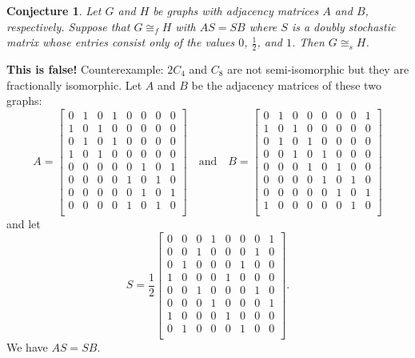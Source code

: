 \documentclass[12pt]{article}
\newcommand{\iso}{\cong}
\newcommand{\siso}{\ensuremath{\iso_s}}
\newcommand{\fiso}{\iso_f}
\newtheorem{conj}[prop]{Conjecture}
\begin{document}
\begin{conj}
  Let $G$ and $H$ be graphs with adjacency matrices $A$ and $B$,
  respectively. Suppose that $G \fiso H$ with $AS=SB$ where $S$ is a
  doubly stochastic matrix whose entries consist only of the values
  $0$, $\frac12$, and $1$. Then $G\siso H$. 
\end{conj}

\noindent\textbf{This is false!} Counterexample: $2C_4$ and $C_8$ are not
semi-isomorphic but they are fractionally isomorphic. Let $A$ and $B$
be the adjacency matrices of these two graphs:
\[
A = 
\left[
\begin{array}{cccccccc}
0 & 1 & 0 & 1 & 0 & 0 & 0 & 0 \\
1 & 0 & 1 & 0 & 0 & 0 & 0 & 0 \\
0 & 1 & 0 & 1 & 0 & 0 & 0 & 0 \\
1 & 0 & 1 & 0 & 0 & 0 & 0 & 0 \\
0 & 0 & 0 & 0 & 0 & 1 & 0 & 1 \\
0 & 0 & 0 & 0 & 1 & 0 & 1 & 0 \\
0 & 0 & 0 & 0 & 0 & 1 & 0 & 1 \\
0 & 0 & 0 & 0 & 1 & 0 & 1 & 0 \\
\end{array}
\right]
\quad\text{and}\quad
B = 
\left[
\begin{array}{cccccccc}
0 & 1 & 0 & 0 & 0 & 0 & 0 & 1 \\
1 & 0 & 1 & 0 & 0 & 0 & 0 & 0 \\
0 & 1 & 0 & 1 & 0 & 0 & 0 & 0 \\
0 & 0 & 1 & 0 & 1 & 0 & 0 & 0 \\
0 & 0 & 0 & 1 & 0 & 1 & 0 & 0 \\
0 & 0 & 0 & 0 & 1 & 0 & 1 & 0 \\
0 & 0 & 0 & 0 & 0 & 1 & 0 & 1 \\
1 & 0 & 0 & 0 & 0 & 0 & 1 & 0 \\
\end{array}
\right]
\]
and let
\[
S = \frac12\left[
\begin{array}{cccccccc}
0 & 0 & 0 & 1 & 0 & 0 & 0 & 1 \\
0 & 0 & 1 & 0 & 0 & 0 & 1 & 0 \\
0 & 1 & 0 & 0 & 0 & 1 & 0 & 0 \\
1 & 0 & 0 & 0 & 1 & 0 & 0 & 0 \\
0 & 0 & 1 & 0 & 0 & 0 & 1 & 0 \\
0 & 0 & 0 & 1 & 0 & 0 & 0 & 1 \\
1 & 0 & 0 & 0 & 1 & 0 & 0 & 0 \\
0 & 1 & 0 & 0 & 0 & 1 & 0 & 0 \\
\end{array}
\right].
\]
We have $AS=SB$.
\end{document}
